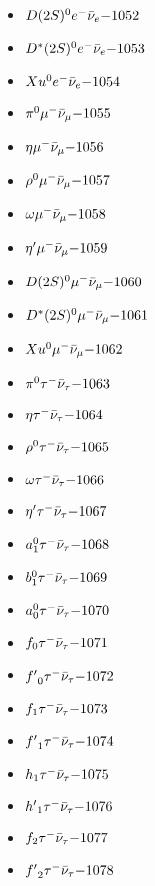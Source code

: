 \begin{multicols}{3}
\begin{itemize}
 \item $ D(2S)^{0} e^{-} \bar{\nu}_{e} \hfill{-1052}$
 \item $ D^{*}(2S)^{0} e^{-} \bar{\nu}_{e} \hfill{-1053}$
 \item $ Xu^{0} e^{-} \bar{\nu}_{e} \hfill{-1054}$
 \item $ \pi^{0} \mu^{-} \bar{\nu}_{\mu} \hfill{-1055}$
 \item $ \eta \mu^{-} \bar{\nu}_{\mu} \hfill{-1056}$
 \item $ \rho^{0} \mu^{-} \bar{\nu}_{\mu} \hfill{-1057}$
 \item $ \omega \mu^{-} \bar{\nu}_{\mu} \hfill{-1058}$
 \item $ {\eta^{\prime}} \mu^{-} \bar{\nu}_{\mu} \hfill{-1059}$
 \item $ D(2S)^{0} \mu^{-} \bar{\nu}_{\mu} \hfill{-1060}$
 \item $ D^{*}(2S)^{0} \mu^{-} \bar{\nu}_{\mu} \hfill{-1061}$
 \item $ Xu^{0} \mu^{-} \bar{\nu}_{\mu} \hfill{-1062}$
 \item $ \pi^{0} \tau^{-} \bar{\nu}_{\tau} \hfill{-1063}$
 \item $ \eta \tau^{-} \bar{\nu}_{\tau} \hfill{-1064}$
 \item $ \rho^{0} \tau^{-} \bar{\nu}_{\tau} \hfill{-1065}$
 \item $ \omega \tau^{-} \bar{\nu}_{\tau} \hfill{-1066}$
 \item $ {\eta^{\prime}} \tau^{-} \bar{\nu}_{\tau} \hfill{-1067}$
 \item $ a_{1}^{0} \tau^{-} \bar{\nu}_{\tau} \hfill{-1068}$
 \item $ b_{1}^{0} \tau^{-} \bar{\nu}_{\tau} \hfill{-1069}$
 \item $ a_{0}^{0} \tau^{-} \bar{\nu}_{\tau} \hfill{-1070}$
 \item $ f_{0} \tau^{-} \bar{\nu}_{\tau} \hfill{-1071}$
 \item $ {f^{\prime}}_{0} \tau^{-} \bar{\nu}_{\tau} \hfill{-1072}$
 \item $ f_{1} \tau^{-} \bar{\nu}_{\tau} \hfill{-1073}$
 \item $ {f^{\prime}}_{1} \tau^{-} \bar{\nu}_{\tau} \hfill{-1074}$
 \item $ h_{1} \tau^{-} \bar{\nu}_{\tau} \hfill{-1075}$
 \item $ {h^{\prime}}_{1} \tau^{-} \bar{\nu}_{\tau} \hfill{-1076}$
 \item $ f_{2} \tau^{-} \bar{\nu}_{\tau} \hfill{-1077}$
 \item $ {f^{\prime}}_{2} \tau^{-} \bar{\nu}_{\tau} \hfill{-1078}$

\end{itemize}
\end{multicols}
